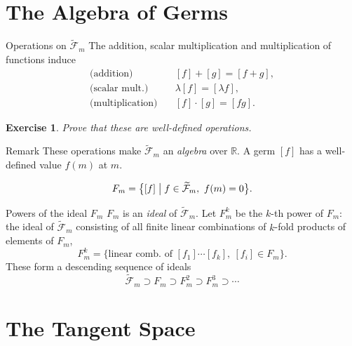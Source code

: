 \documentclass[10pt]{beamer}
\newtheorem{exercise}{Exercise}
\newcommand{\R}{\mathbb{R}}
\newcommand{\F}{\mathcal{F}}
\begin{document}
\section{The Algebra of Germs}

\begin{frame}{Operations on $\widetilde{\F}_m$}
	The addition, scalar multiplication and multiplication of functions
	induce
	\begin{align*}
		\text{(addition)}       & \quad [f] + [g] = [f + g],       \\
		\text{(scalar mult.)}   & \quad \lambda [f] = [\lambda f], \\
		\text{(multiplication)} & \quad [f] \cdot [g] = [fg].
	\end{align*}
	\begin{exercise}
		Prove that these are well-defined operations.
	\end{exercise}
	\begin{block}{Remark}
		These operations make $\widetilde{\F}_m$ an \emph{algebra} over
		$\R$. A germ $[f]$ has a well-defined value $f(m)$ at $m$.
	\end{block}
	\begin{definition}
		\[
			F_m = \bigl\{ [f] \bigm| f \in \widetilde{\F}_m,\ f(m) = 0 \bigr\}.
		\]
	\end{definition}
\end{frame}

\begin{frame}{Powers of the ideal $F_m$}
	$F_m$ is an \emph{ideal} of $\widetilde{\F}_m$. Let $F_m^k$ be the
	$k$-th power of $F_m$: the ideal of $\widetilde{\F}_m$ consisting of
	all finite linear combinations of $k$-fold products of elements of
	$F_m$,
	\[
		F_m^k = \bigl\{ \text{linear comb.\ of } [f_1] \cdots [f_k],
		\ [f_i] \in F_m \bigr\}.
	\]
	These form a descending sequence of ideals
	\[
		\widetilde{\F}_m \supset F_m \supset F_m^2 \supset F_m^3
		\supset \cdots
	\]
\end{frame}

\section{The Tangent Space}
\end{document}

